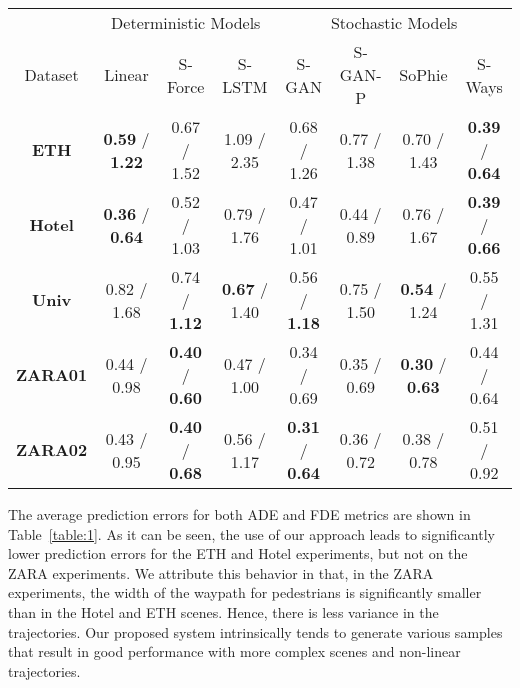 \documentclass[10pt,twocolumn,letterpaper]{article}
\begin{document}
\begin{table*}[t]
	\begin{center}
	\begin{tabular}{c||c|c|c||c|c|c|||c}
		
\multicolumn{1}{c}{~} &
		\multicolumn{3}{c}{Deterministic Models} &
		\multicolumn{4}{c}{Stochastic Models} \\
		Dataset & Linear & S-Force & S-LSTM & S-GAN & S-GAN-P & SoPhie & S-Ways \\
		\hline \hline
		
		\textbf{ETH}
                & \textbf{0.59} / \textbf{1.22} & 0.67 / 1.52 & 1.09 / 2.35 & 0.68 / 1.26 & 0.77 / 1.38 & 0.70 / 1.43 & \textbf{0.39} / \textbf{0.64} \\


\textbf{Hotel}
                & \textbf{0.36} / \textbf{0.64} & 0.52 / 1.03 & 0.79 / 1.76 & 0.47 / 1.01 & 0.44 / 0.89 & 0.76 / 1.67  & \textbf{0.39} / \textbf{0.66} \\


\textbf{Univ}
                & 0.82 / 1.68 & 0.74 / \textbf{1.12} & \textbf{0.67} / 1.40 & 0.56 / \textbf{1.18} & 0.75 / 1.50 & \textbf{0.54} / 1.24 & 0.55 / 1.31 \\


\textbf{ZARA01}
                & 0.44 / 0.98 & \textbf{0.40} / \textbf{0.60} & 0.47 / 1.00 & 0.34 / 0.69 & 0.35 / 0.69 & \textbf{0.30} / \textbf{0.63} & 0.44 / 0.64 \\


\textbf{ZARA02}
                & 0.43 / 0.95 & \textbf{0.40} / \textbf{0.68} & 0.56 / 1.17 & \textbf{0.31} / \textbf{0.64} & 0.36 / 0.72 & 0.38 / 0.78 & 0.51 / 0.92  \\
\end{tabular}
	\end{center}
	\caption{Comparison of prediction error of our proposed method (S-Ways) vs baselines. The ADE and FDE values are separated by slash.}
\label{table:1}
\end{table*}

The average prediction errors for both ADE and FDE metrics are shown in Table~\ref{table:1}. As it can be seen, the use of our approach leads to significantly lower prediction errors for the ETH and Hotel experiments, but not on the ZARA experiments. We attribute this behavior in that, in the ZARA experiments, the width of the waypath for pedestrians is significantly smaller than in the Hotel and ETH scenes. Hence, there is less variance in the trajectories. Our proposed system intrinsically tends to generate various samples that result in good performance with more complex scenes and non-linear trajectories.
\end{document}
